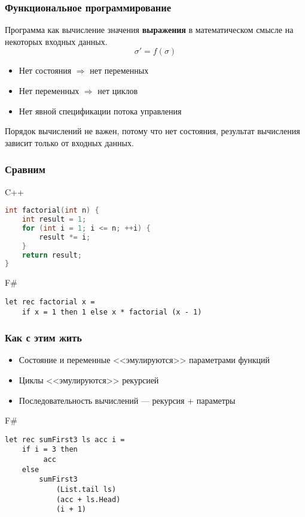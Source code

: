 \documentclass[xetex,mathserif,serif]{beamer}
\begin{document}
	\begin{frame}
		\frametitle{Функциональное программирование}
		Программа как вычисление значения \textbf{выражения} в математическом смысле на некоторых входных данных.
		$$\sigma' = f(\sigma)$$
	
		\begin{itemize}
			\item Нет состояния $\Rightarrow$ нет переменных
			\item Нет переменных $\Rightarrow$ нет циклов
			\item Нет явной спецификации потока управления
		\end{itemize}
		Порядок вычислений не важен, потому что нет состояния, результат вычисления зависит только от входных данных.
	\end{frame}
	
	\begin{frame}[fragile]
		\frametitle{Сравним}
		\begin{alertblock}{C++}
			\begin{lstlisting}[language=C++]
int factorial(int n) {
    int result = 1;
    for (int i = 1; i <= n; ++i) {
        result *= i;
    }
    return result;
}
            \end{lstlisting}
		\end{alertblock}
		\begin{exampleblock}{F\#}
			\begin{lstlisting}
let rec factorial x =
    if x = 1 then 1 else x * factorial (x - 1)
            \end{lstlisting}
		\end{exampleblock}
\end{frame}

	\begin{frame}[fragile]
		\frametitle{Как с этим жить}
		\begin{itemize}
			\item Состояние и переменные <<эмулируются>> параметрами функций
			\item Циклы <<эмулируются>> рекурсией
			\item Последовательность вычислений --- рекурсия + параметры
		\end{itemize}
		\begin{exampleblock}{F\#}
			\begin{lstlisting}
let rec sumFirst3 ls acc i =
    if i = 3 then 
         acc 
    else 
        sumFirst3 
            (List.tail ls) 
            (acc + ls.Head) 
            (i + 1)
            \end{lstlisting}
		\end{exampleblock}
\end{frame}
\end{document}
